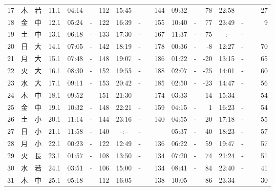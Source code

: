 \documentclass[12pt,a4j]{jsarticle}
\begin{document}
\begin{center}
\begin{table}[ht]
\begin{tabular}{|rc|cr|ccrccr|ccrccr|}
17 & 木 & 若 & 11.1 &  04:14 &-& 112  &  15:45 &-& 144  &   09:32 &-&  78  &   22:58 &-&  27  \\
18 & 金 & 中 & 12.1 &  05:24 &-& 122  &  16:39 &-& 155  &   10:40 &-&  77  &   23:49 &-&   9  \\
19 & 土 & 中 & 13.1 &  06:18 &-& 133  &  17:30 &-& 167  &   11:37 &-&  75  &   --:-- &-&~~~~~ \\
20 & 日 & 大 & 14.1 &  07:05 &-& 142  &  18:19 &-& 178  &   00:36 &-&  -8  &   12:27 &-&  70  \\
21 & 月 & 大 & 15.1 &  07:48 &-& 148  &  19:07 &-& 186  &   01:22 &-& -20  &   13:15 &-&  65  \\
22 & 火 & 大 & 16.1 &  08:30 &-& 152  &  19:55 &-& 188  &   02:07 &-& -25  &   14:01 &-&  60  \\
23 & 水 & 大 & 17.1 &  09:11 &-& 153  &  20:42 &-& 185  &   02:50 &-& -23  &   14:47 &-&  56  \\
24 & 木 & 中 & 18.1 &  09:52 &-& 151  &  21:30 &-& 174  &   03:33 &-& -14  &   15:34 &-&  54  \\
25 & 金 & 中 & 19.1 &  10:32 &-& 148  &  22:21 &-& 159  &   04:15 &-&   1  &   16:23 &-&  54  \\
26 & 土 & 小 & 20.1 &  11:14 &-& 144  &  23:16 &-& 140  &   04:55 &-&  20  &   17:18 &-&  55  \\
27 & 日 & 小 & 21.1 &  11:58 &-& 140  &  --:-- &-&~~~~~ &   05:37 &-&  40  &   18:23 &-&  57  \\
28 & 月 & 小 & 22.1 &  00:23 &-& 122  &  12:49 &-& 136  &   06:22 &-&  59  &   19:47 &-&  57  \\
29 & 火 & 長 & 23.1 &  01:57 &-& 108  &  13:50 &-& 134  &   07:20 &-&  74  &   21:24 &-&  51  \\
30 & 水 & 若 & 24.1 &  03:51 &-& 106  &  15:00 &-& 134  &   08:41 &-&  84  &   22:40 &-&  41  \\
31 & 木 & 中 & 25.1 &  05:18 &-& 112  &  16:05 &-& 138  &   10:05 &-&  86  &   23:34 &-&  30  \\
   \hline
   \end{tabular}
\end{table}
\newpage
\end{center}
\end{document}
